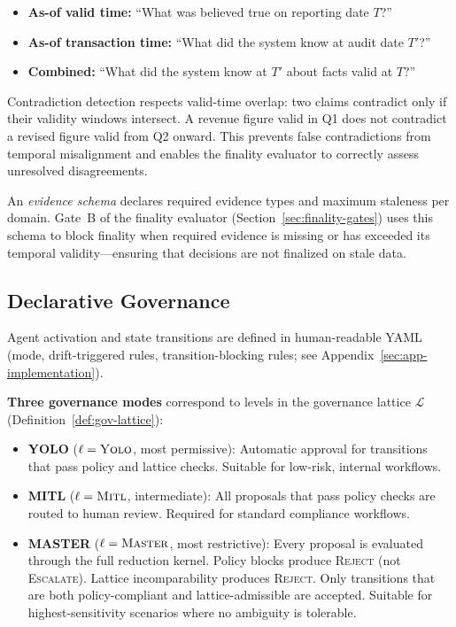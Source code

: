 \documentclass[11pt]{article}
\begin{document}
\begin{itemize}
  \item \textbf{As-of valid time:} ``What was believed true on reporting date $T$?''
  \item \textbf{As-of transaction time:} ``What did the system know at audit date $T'$?''
  \item \textbf{Combined:} ``What did the system know at $T'$ about facts valid at $T$?''
\end{itemize}

Contradiction detection respects valid-time overlap: two claims contradict only if their validity windows intersect. A revenue figure valid in Q1 does not contradict a revised figure valid from Q2 onward. This prevents false contradictions from temporal misalignment and enables the finality evaluator to correctly assess unresolved disagreements.

An \emph{evidence schema} declares required evidence types and maximum staleness per domain. Gate~B of the finality evaluator (Section~\ref{sec:finality-gates}) uses this schema to block finality when required evidence is missing or has exceeded its temporal validity---ensuring that decisions are not finalized on stale data.

\subsection{Declarative Governance}
\label{sec:declarative-governance}

Agent activation and state transitions are defined in human-readable YAML (mode, drift-triggered rules, transition-blocking rules; see Appendix~\ref{sec:app-implementation}).

\textbf{Three governance modes} correspond to levels in the governance lattice $\mathcal{L}$ (Definition~\ref{def:gov-lattice}):

\begin{itemize}
  \item \textbf{YOLO} ($\ell = \textsc{Yolo}$, most permissive): Automatic approval for transitions that pass policy and lattice checks. Suitable for low-risk, internal workflows.
  \item \textbf{MITL} ($\ell = \textsc{Mitl}$, intermediate): All proposals that pass policy checks are routed to human review. Required for standard compliance workflows.
  \item \textbf{MASTER} ($\ell = \textsc{Master}$, most restrictive): Every proposal is evaluated through the full reduction kernel. Policy blocks produce \textsc{Reject} (not \textsc{Escalate}). Lattice incomparability produces \textsc{Reject}. Only transitions that are both policy-compliant and lattice-admissible are accepted. Suitable for highest-sensitivity scenarios where no ambiguity is tolerable.
\end{itemize}
\end{document}
